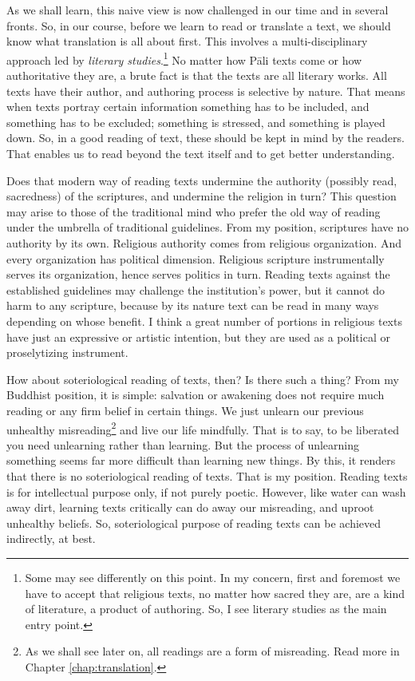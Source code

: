As we shall learn, this naive view is now challenged in our time and in several fronts. So, in our course, before we learn to read or translate a text, we should know what translation is all about first. This involves a multi-disciplinary approach led by \emph{literary studies}.\footnote{Some may see differently on this point. In my concern, first and foremost we have to accept that religious texts, no matter how sacred they are, are a kind of literature, a product of authoring. So, I see literary studies as the main entry point.} No matter how P\=ali texts come or how authoritative they are, a brute fact is that the texts are all literary works. All texts have their author, and authoring process is selective by nature. That means when texts portray certain information something has to be included, and something has to be excluded; something is stressed, and something is played down. So, in a good reading of text, these should be kept in mind by the readers. That enables us to read beyond the text itself and to get better understanding.

Does that modern way of reading texts undermine the authority (possibly read, sacredness) of the scriptures, and undermine the religion in turn? This question may arise to those of the traditional mind who prefer the old way of reading under the umbrella of traditional guidelines. From my position, scriptures have no authority by its own. Religious authority comes from religious organization. And every organization has political dimension. Religious scripture instrumentally serves its organization, hence serves politics in turn. Reading texts against the established guidelines may challenge the institution's power, but it cannot do harm to any scripture, because by its nature text can be read in many ways depending on whose benefit. I think a great number of portions in religious texts have just an expressive or artistic intention, but they are used as a political or proselytizing instrument.

How about soteriological reading of texts, then? Is there such a thing? From my Buddhist position, it is simple: salvation or awakening does not require much reading or any firm belief in certain things. We just unlearn our previous unhealthy misreading\footnote{As we shall see later on, all readings are a form of misreading. Read more in Chapter \ref{chap:translation}.} and live our life mindfully. That is to say, to be liberated you need unlearning rather than learning. But the process of unlearning something seems far more difficult than learning new things. By this, it renders that there is no soteriological reading of texts. That is my position. Reading texts is for intellectual purpose only, if not purely poetic. However, like water can wash away dirt, learning texts critically can do away our misreading, and uproot unhealthy beliefs. So, soteriological purpose of reading texts can be achieved indirectly, at best.

